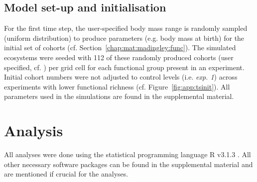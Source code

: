 \subsection{Model set-up and initialisation}
For the first time step, the user-specified body mass range is randomly sampled (uniform distribution) to produce parameters (e.g. body mass at birth) for the initial set of  cohorts (cf. Section~\ref{chap:mat:madingley:func}).
The simulated ecosystems were seeded with 112 of these randomly produced cohorts (user specified, cf. \citealp{Harfoot2014}) per grid cell for each functional group present in an experiment.\\
Initial cohort numbers were not adjusted to control levels (i.e. \textit{exp. 1}) across experiments with lower functional richness (cf. Figure~\ref{fig:app:tsinit}).
All parameters used in the simulations are found in the supplemental material. 

%

\section{Analysis}
\label{chap:mat:analysis}
All analyses were done using the statistical programming language \textsc{R} v3.1.3 \citep{RCT2015}. All other necessary software packages can be found in the supplemental material and are mentioned if crucial for the analyses.
